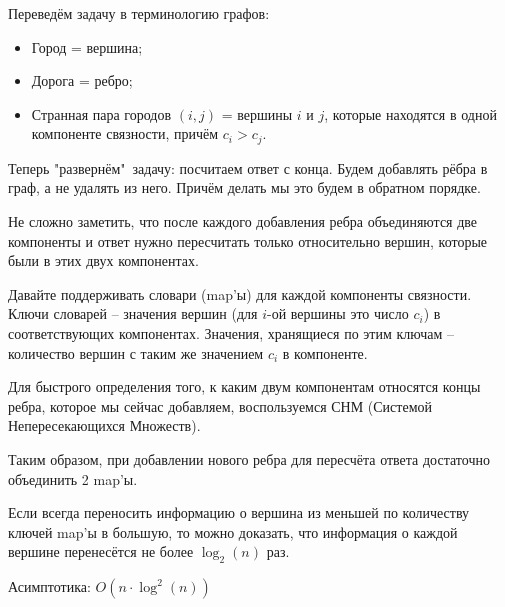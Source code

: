 \solutionSection

Переведём задачу в терминологию графов:

\begin{itemize}
\item Город = вершина;
\item Дорога = ребро;
\item Странная пара городов $(i, j)$ = вершины $i$ и $j$, которые
находятся в одной компоненте связности, причём $c_i > c_j$.
\end{itemize}

Теперь "развернём"\ задачу: посчитаем ответ с конца.
Будем добавлять рёбра в граф, а не удалять из него.
Причём делать мы это будем в обратном порядке.

Не сложно заметить, что после каждого добавления ребра
объединяются две компоненты и ответ нужно пересчитать только
относительно вершин, которые были в этих двух компонентах.

Давайте поддерживать словари (map’ы) для каждой компоненты связности.
Ключи словарей -- значения вершин (для $i$-ой вершины это число $c_i$)
в соответствующих компонентах.
Значения, хранящиеся по этим ключам -- количество вершин с таким же
значением $c_i$ в компоненте.

Для быстрого определения того, к каким двум компонентам относятся
концы ребра, которое мы сейчас добавляем, воспользуемся СНМ
(Системой Непересекающихся Множеств).

Таким образом, при добавлении нового ребра для пересчёта ответа достаточно
объединить 2 map’ы.

Если всегда переносить информацию о вершина из меньшей по количеству
ключей map’ы в большую, то можно доказать, что информация о каждой
вершине перенесётся не более $\log_{2}(n)$ раз.

Асимптотика: $O(n \cdot \log^{2}(n))$

\codeExample

